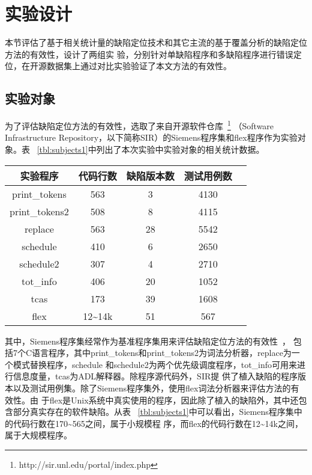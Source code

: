 \section{实验设计}
本节评估了基于相关统计量的缺陷定位技术和其它主流的基于覆盖分析的缺陷定位方法的有效性，设计了两组实
验，分别针对单缺陷程序和多缺陷程序进行错误定位，在开源数据集上通过对比实验验证了本文方法的有效性。

\subsection{实验对象}

为了评估缺陷定位方法的有效性，选取了来自开源软件仓库~\footnote{http://sir.unl.edu/portal/index.php}
（Software Infrastructure Repository，以下简称SIR）的Siemens程序集和flex程序作为实验对象。表
~\ref{tbl:subjects1}中列出了本次实验中实验对象的相关统计数据。


\begin{center}
\label{tbl:subjects1}
\begin{tabular}{|c|c|c|c|c|}
\hline
实验程序 & 代码行数 & 缺陷版本数 & 测试用例数\\ \hline
print\_tokens & 563 & 3 &4130\\ \hline
print\_tokens2 & 508 & 8 & 4115\\ \hline
replace & 563 & 28 & 5542\\ \hline
schedule & 410 & 6 & 2650\\ \hline
schedule2 & 307 & 4 & 2710\\ \hline
tot\_info & 406 & 20 & 1052\\ \hline
tcas & 173 & 39 & 1608\\ \hline
flex & 12\textasciitilde14k & 51 & 567\\ \hline
\end{tabular}
\end{center}

其中，Siemens程序集经常作为基准程序集用来评估缺陷定位方法的有效性~\cite{guanlian2013,con-prob2018}，
包括7个C语言程序，其中print\_tokens和print\_tokens2为词法分析器，replace为一个模式替换程序，schedule
和schedule2为两个优先级调度程序，tot\_info可用来进行信息度量，tcas为ADL解释器。除程序源代码外，SIR提
供了植入缺陷的程序版本以及测试用例集。除了Siemens程序集外，使用flex词法分析器来评估方法的有效性。由
于flex是Unix系统中真实使用的程序，因此除了植入的缺陷外，其中还包含部分真实存在的软件缺陷。从表
~\ref{tbl:subjects1}中可以看出，Siemens程序集中的代码行数在170\textasciitilde565之间，属于小规模程
序，而flex的代码行数在12\textasciitilde14k之间，属于大规模程序。


